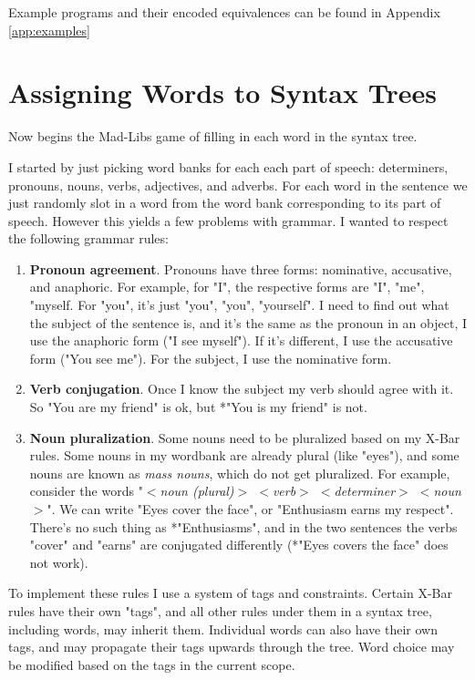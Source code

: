 \documentclass[runningheads]{llncs}
\begin{document}
Example programs and their encoded equivalences can be found in Appendix \ref{app:examples}

\section{Assigning Words to Syntax Trees}
Now begins the Mad-Libs game of filling in each word in the syntax tree.

I started by just picking word banks for each each part of speech: determiners, pronouns, nouns, verbs, adjectives, and adverbs. For each word in the sentence we just randomly slot in a word from the word bank corresponding to its part of speech. However this yields a few problems with grammar. I wanted to respect the following grammar rules:
\begin{enumerate}
	\item \textbf{Pronoun agreement}. Pronouns have three forms: nominative, accusative, and anaphoric. For example, for "I", the respective forms are "I", "me", "myself. For "you", it's just "you", "you", "yourself". I need to find out what the subject of the sentence is, and it's the same as the pronoun in an object, I use the anaphoric form ("I see myself"). If it's different, I use the accusative form ("You see me"). For the subject, I use the nominative form.
	\item \textbf{Verb conjugation}. Once I know the subject my verb should agree with it. So "You are my friend" is ok, but *"You is my friend" is not.
	\item \textbf{Noun pluralization}. Some nouns need to be pluralized based on my X-Bar rules. Some nouns in my wordbank are already plural (like "eyes"), and some nouns are known as \textit{mass nouns}, which do not get pluralized. For example, consider the words "\textit{$<$noun (plural)$>$ $<$verb$>$ $<$determiner$>$ $<$noun$>$}".  We can write "Eyes cover the face", or  "Enthusiasm earns my respect". There's no such thing as *"Enthusiasms", and in the two sentences the verbs "cover" and "earns" are conjugated differently (*"Eyes covers the face" does not work).
\end{enumerate}
To implement these rules I use a system of tags and constraints. Certain X-Bar rules have their own "tags", and all other rules under them in a syntax tree, including words, may inherit them. Individual words can also have their own tags, and may propagate their tags upwards through the tree. Word choice may be modified based on the tags in the current scope.
\end{document}
